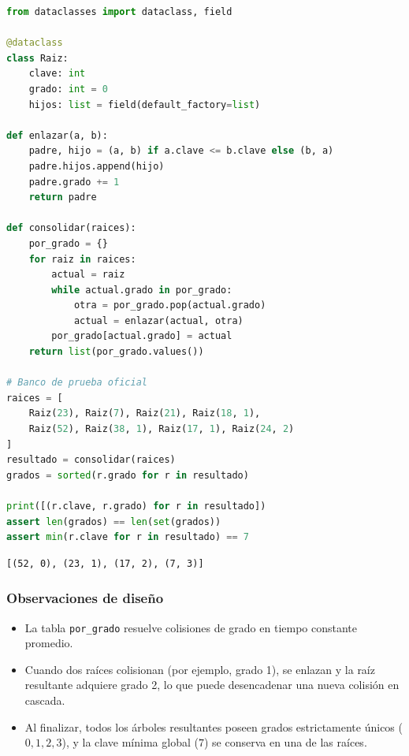 \begin{lstlisting}[language=Python, caption={Código del Ejercicio Resuelto 2 (consolidación simplificada)}, label={lst:resuelto_2}]
from dataclasses import dataclass, field

@dataclass
class Raiz:
    clave: int
    grado: int = 0
    hijos: list = field(default_factory=list)

def enlazar(a, b):
    padre, hijo = (a, b) if a.clave <= b.clave else (b, a)
    padre.hijos.append(hijo)
    padre.grado += 1
    return padre

def consolidar(raices):
    por_grado = {}
    for raiz in raices:
        actual = raiz
        while actual.grado in por_grado:
            otra = por_grado.pop(actual.grado)
            actual = enlazar(actual, otra)
        por_grado[actual.grado] = actual
    return list(por_grado.values())

# Banco de prueba oficial
raices = [
    Raiz(23), Raiz(7), Raiz(21), Raiz(18, 1),
    Raiz(52), Raiz(38, 1), Raiz(17, 1), Raiz(24, 2)
]
resultado = consolidar(raices)
grados = sorted(r.grado for r in resultado)

print([(r.clave, r.grado) for r in resultado])
assert len(grados) == len(set(grados))
assert min(r.clave for r in resultado) == 7
\end{lstlisting}

\begin{lstlisting}[style=consolestyle, caption={Salida de consola del Ejercicio Resuelto 2}]
[(52, 0), (23, 1), (17, 2), (7, 3)]
\end{lstlisting}

\subsubsection*{Observaciones de diseño}
\begin{itemize}
    \item La tabla \texttt{por\_grado} resuelve colisiones de grado en tiempo constante promedio.
    \item Cuando dos raíces colisionan (por ejemplo, grado 1), se enlazan y la raíz resultante adquiere grado 2, lo que puede desencadenar una nueva colisión en cascada.
    \item Al finalizar, todos los árboles resultantes poseen grados estrictamente únicos ($0, 1, 2, 3$), y la clave mínima global ($7$) se conserva en una de las raíces.
\end{itemize}

